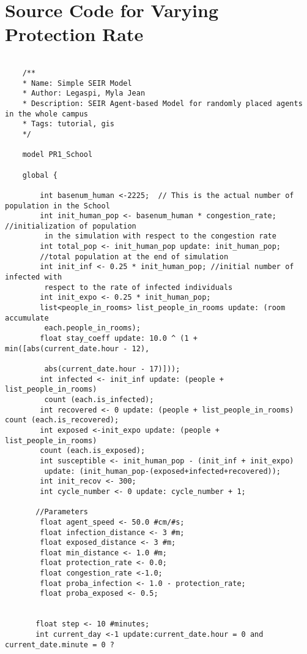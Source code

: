 \chapter{Source Code for Varying Protection Rate}
\scriptsize
\begin{lstlisting}

    /**
    * Name: Simple SEIR Model
    * Author: Legaspi, Myla Jean
    * Description: SEIR Agent-based Model for randomly placed agents in the whole campus
    * Tags: tutorial, gis
    */
    
    model PR1_School
    
    global {
        
        int basenum_human <-2225;  // This is the actual number of population in the School
        int init_human_pop <- basenum_human * congestion_rate; //initialization of population
         in the simulation with respect to the congestion rate
        int total_pop <- init_human_pop update: init_human_pop; 
        //total population at the end of simulation
        int init_inf <- 0.25 * init_human_pop; //initial number of infected with
         respect to the rate of infected individuals
        int init_expo <- 0.25 * init_human_pop;
        list<people_in_rooms> list_people_in_rooms update: (room accumulate
         each.people_in_rooms);
        float stay_coeff update: 10.0 ^ (1 + min([abs(current_date.hour - 12),
        
         abs(current_date.hour - 17)]));
        int infected <- init_inf update: (people + list_people_in_rooms)
         count (each.is_infected);
        int recovered <- 0 update: (people + list_people_in_rooms) count (each.is_recovered);
        int exposed <-init_expo update: (people + list_people_in_rooms) 
        count (each.is_exposed);
        int susceptible <- init_human_pop - (init_inf + init_expo)
         update: (init_human_pop-(exposed+infected+recovered));
        int init_recov <- 300;
        int cycle_number <- 0 update: cycle_number + 1;
        
       //Parameters 
        float agent_speed <- 50.0 #cm/#s;    
        float infection_distance <- 3 #m;
        float exposed_distance <- 3 #m;
        float min_distance <- 1.0 #m;
        float protection_rate <- 0.0;
        float congestion_rate <-1.0;  
        float proba_infection <- 1.0 - protection_rate;
        float proba_exposed <- 0.5;
        
        
       float step <- 10 #minutes;
       int current_day <-1 update:current_date.hour = 0 and current_date.minute = 0 ? 
       

\end{lstlisting}
